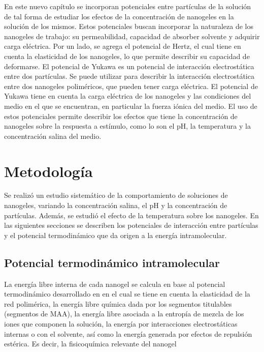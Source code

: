 	
	En este nuevo cap\'itulo se incorporan potenciales entre part\'iculas de la soluci\'on de tal forma de estudiar los efectos de la concentraci\'on de nanogeles en la soluci\'on de los mismos.
	Estos potenciales buscan incorporar la naturaleza de los nanogeles de trabajo: su permeabilidad, capacidad de absorber solvente y adquirir carga el\'ectrica.
	Por un lado, se agrega el potencial de Hertz, el cual tiene en cuenta la elasticidad de los nanogeles, lo que permite describir su capacidad de deformarse.
	El potencial de Yukawa es un potencial de interacci\'on electrost\'atica entre dos part\'iculas. Se puede utilizar para describir la interacci\'on electrost\'atica entre dos nanogeles polim\'ericos, que pueden tener carga el\'ectrica. El potencial de Yukawa tiene en cuenta la carga el\'ectrica de los nanogeles y las condiciones del medio en el que se encuentran, en particular la fuerza i\'onica del medio.
	El uso de estos potenciales permite describir los efectos que tiene la concentraci\'on de nanogeles sobre la respuesta a est\'imulo, como lo son el pH, la temperatura y la concentraci\'on salina del medio.
	
	
	
	
	
	\section{Metodolog\'ia}
	
	Se realiz\'o un estudio sistem\'atico de la comportamiento de soluciones de nanogeles, variando la concentraci\'on salina, el pH y la concentraci\'on de part\'iculas. Adem\'as, se estudi\'o  el efecto de la temperatura sobre los nanogeles. En las siguientes secciones se describen los potenciales de interacci\'on entre part\'iculas y el potencial termodin\'amico que da origen a la energ\'ia intramolecular. 
	
	
	
	\subsection{Potencial termodin\'amico intramolecular}
	
	La energ\'ia libre interna de cada nanogel se calcula en base al potencial termodin\'amico desarrollado en \cite{perez2021thermodynamic} en el cual se tiene en cuenta  la elasticidad de la red polim\'erica, la energ\'ia libre qu\'imica dada por los segmentos titulables (segmentos de MAA), la energ\'ia libre asociada a la entrop\'ia de mezcla de los iones que componen la soluci\'on, la energ\'ia por interacciones electrost\'aticas internas o con el solvente, as\'i como la energ\'ia generada por efectos de repulsi\'on est\'erica. Es decir, la fisicoqu\'imica relevante del nanogel
	
